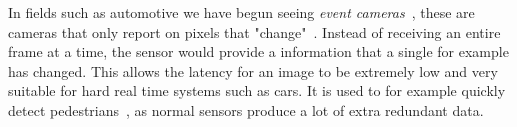 In fields such as automotive we have begun seeing \textit{event cameras}~\cite{shariff2024event},
these are cameras that only report on pixels that "change"~\cite{rebecq2019events}.
Instead of receiving an entire frame at a time, the sensor would provide a
information that a single for example has changed. This allows the latency for
an image to be extremely low and very suitable for hard real time systems such
as cars. It is used to for example quickly detect pedestrians~\cite{wang2024research},
as normal sensors produce a lot of extra redundant data.
